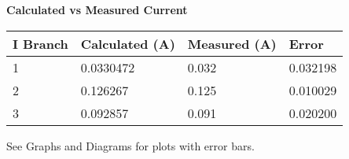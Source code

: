 \begin{center}
\textbf{Calculated vs Measured Current} \\
\begin{tabular}{| l | l | l | l |}
	\hline
	I Branch&Calculated (A)&Measured (A)&Error \\ \hline
	1&0.0330472&0.032&0.032198  \\ \hline
	2&0.126267&0.125&0.010029 \\ \hline
	3&0.092857& 0.091&0.020200 \\ \hline
\end{tabular}

See Graphs and Diagrams for plots with error bars.

\end{center}